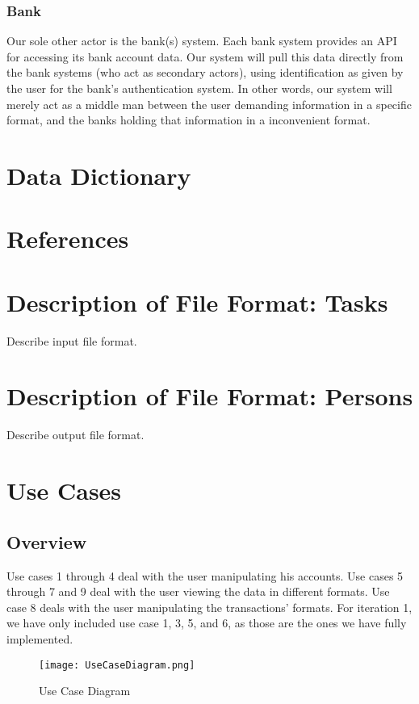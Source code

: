 \documentclass[11pt]{article}
\newcounter{use case ID}
\begin{document}
\subsubsection{Bank}
Our sole other actor is the bank(s) system. Each bank system provides an API for accessing its bank account data. Our system will pull this data directly from the bank systems (who act as secondary actors), using identification as given by the user for the bank's authentication system. In other words, our system will merely act as a middle man between the user demanding information in a specific format, and the banks holding that information in a inconvenient format.


\section{Data Dictionary}

\section{References}

\appendix

\section{Description of File Format: Tasks}

Describe input file format.

\section{Description of File Format: Persons}

Describe output file format.

\section{Use Cases}
\subsection{Overview}
Use cases 1 through 4 deal with the user manipulating his accounts. Use cases 5 through 7 and 9 deal with the user viewing the data in different formats. Use case 8 deals with the user manipulating the transactions' formats. For iteration 1, we have only included use case 1, 3, 5, and 6, as those are the ones we have fully implemented.

\begin{figure}[htbp]
\texttt{[image: UseCaseDiagram.png]}
\caption{Use Case Diagram}
\label{fig:use-case-diagram}
\end{figure}
\end{document}
